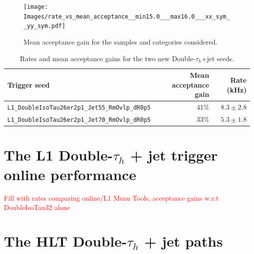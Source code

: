 \documentclass[../main.tex]{subfiles}
\begin{document}
\begin{figure}
\centering\texttt{[image: Images/rate\_vs\_mean\_acceptance\_\_min15.0\_\_\_max16.0\_\_\_xx\_sym\_\_yy\_sym.pdf]}

\caption{Mean acceptance gain for the samples and categories considered.}
\label{hh:fig:l1_trig_mean_acc}
\end{figure}

\begin{table}[h!]
\begin{center}
\begin{tabular}{|l|r|r|}
\hline
Trigger seed & Mean acceptance gain & Rate (kHz) \\\hline
\texttt{L1\_DoubleIsoTau26er2p1\_Jet55\_RmOvlp\_dR0p5} & 41$\%$& $8.3 \pm 2.8$ \\
\texttt{L1\_DoubleIsoTau26er2p1\_Jet70\_RmOvlp\_dR0p5} & 33$\%$& $5.3 \pm 1.8$ \\\hline
\end{tabular}
\end{center}

\caption{Rates and mean acceptance gains for the two new Double-$\tau_h$+jet seeds.}
\label{hh:tab:l1trig:allseeds}
\end{table}



\section{The L1 Double-$\tau_h$ + jet trigger online performance}

\textcolor{red}{Fill with rates comparing online/L1 Menu Tools, acceptance gains w.r.t DoubleIsoTau32 alone}


\section{The HLT Double-$\tau_h$ + jet paths}






\end{document}
